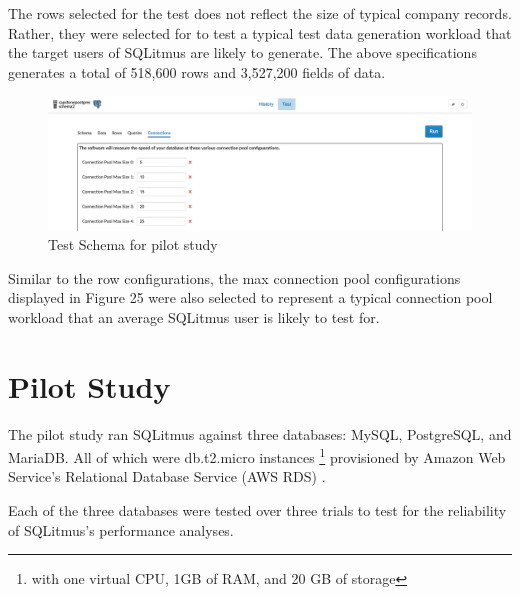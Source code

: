 \documentclass[12pt]{article}
\begin{document}
\begin{spacing}{1.9}
\begin{figure}[H]
	\end{figure}
	
	The rows selected for the test does not reflect the size of typical company records. Rather, they were selected for to test a typical test data generation workload that the target users of SQLitmus are likely to generate. The above specifications generates a total of 518,600 rows and 3,527,200 fields of data.
	
	\begin{figure}[H]
		\centering
		\includegraphics[width=\textwidth]{4-3b.png}
		\caption{Test Schema for pilot study }
		
	\end{figure}
	
	Similar to the row configurations, the max connection pool configurations displayed in Figure 25 were also selected to represent a typical connection pool workload that an average SQLitmus user is likely to test for. 
	
	\section{ Pilot Study}
	
	The pilot study ran SQLitmus against three databases: MySQL, PostgreSQL, and MariaDB. All of which were db.t2.micro instances \footnote{with one virtual CPU, 1GB of RAM, and 20 GB of storage} provisioned by Amazon Web Service's Relational Database Service (AWS RDS) . 
	
	Each of the three databases were tested over three trials to test for the reliability of SQLitmus's performance analyses.
	
	
	\clearpage

\end{spacing}
\end{document}
